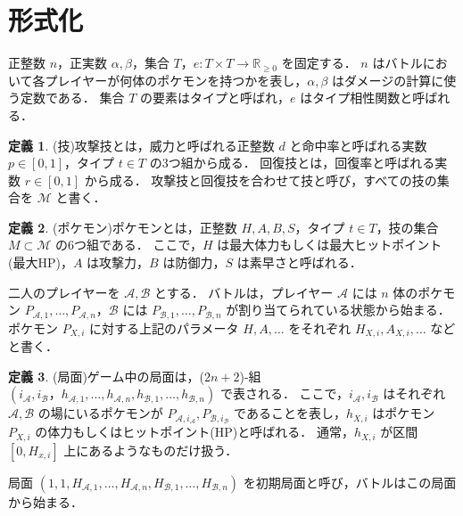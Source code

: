 \documentclass{jsarticle}
\theoremstyle{definition}
\newtheorem{definition}{定義}
\begin{document}
\section{形式化}
正整数 $n$，正実数 $\alpha,\beta$，集合 $T$，$e\colon T \times T \to \mathbb{R}_{\ge 0}$ を固定する．
$n$ はバトルにおいて各プレイヤーが何体のポケモンを持つかを表し，$\alpha,\beta$ はダメージの計算に使う定数である．
集合 $T$ の要素はタイプと呼ばれ，$e$ はタイプ相性関数と呼ばれる．
\begin{definition}
(技)攻撃技とは，威力と呼ばれる正整数 $d$ と命中率と呼ばれる実数 $p\in [0,1]$，タイプ $t\in T$ の3つ組から成る．
回復技とは，回復率と呼ばれる実数 $r \in [0,1]$ から成る．
攻撃技と回復技を合わせて技と呼び，すべての技の集合を $\mathcal M$ と書く．
\end{definition}
\begin{definition}
(ポケモン)ポケモンとは，正整数 $H,A,B,S$，タイプ $t \in T$，技の集合 $M\subset \mathcal M$ の6つ組である．
ここで，$H$ は最大体力もしくは最大ヒットポイント(最大HP)，$A$ は攻撃力，$B$ は防御力，$S$ は素早さと呼ばれる．
\end{definition}
二人のプレイヤーを $\mathcal A,\mathcal B$ とする．
バトルは，プレイヤー $\mathcal A$ には $n$ 体のポケモン $P_{\mathcal A,1},\dots,P_{\mathcal A,n}$，$\mathcal B$ には $P_{\mathcal B,1},\dots,P_{\mathcal B,n}$ が割り当てられている状態から始まる．
ポケモン $P_{X,i}$ に対する上記のパラメータ $H,A,\dots$ をそれぞれ $H_{X,i},A_{X,i},\dots$ などと書く．
\begin{definition}
(局面)ゲーム中の局面は，($2n+2$)-組 $(i_\mathcal A,i_\mathcal B，h_{\mathcal A,1},\dots,h_{\mathcal A,n},h_{\mathcal B,1},\dots,h_{\mathcal B,n})$ で表される．
ここで，$i_\mathcal A,i_\mathcal B$ はそれぞれ $\mathcal A,\mathcal B$ の場にいるポケモンが $P_{\mathcal A,i_\mathcal A},P_{\mathcal B,i_\mathcal B}$ であることを表し，$h_{X,i}$ はポケモン $P_{X,i}$ の体力もしくはヒットポイント(HP)と呼ばれる．
通常，$h_{X,i}$ が区間 $[0,H_{x,i}]$ 上にあるようなものだけ扱う．

局面 $(1,1,H_{\mathcal A,1},\dots,H_{\mathcal A,n},H_{\mathcal B,1},\dots,H_{\mathcal B,n})$ を初期局面と呼び，バトルはこの局面から始まる．
\end{definition}
\end{document}
